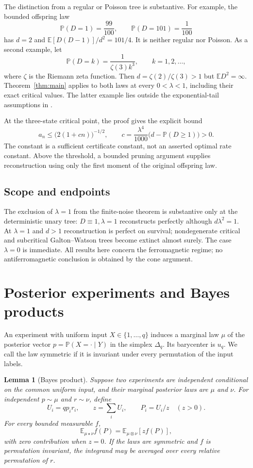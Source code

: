 \documentclass[11pt,reqno]{amsart}
\newtheorem{lemma}[theorem]{Lemma}
\theoremstyle{definition}
\theoremstyle{remark}
\newcommand{\E}{\mathbb E}
\newcommand{\Prob}{\mathbb P}
\begin{document}
The distinction from a regular or Poisson tree is substantive. For example, the bounded offspring law
\[
 \Prob(D=1)=\frac{99}{100},\qquad \Prob(D=101)=\frac1{100}
\]
has $d=2$ and $\E[D(D-1)]/d^2=101/4$. It is neither regular nor Poisson. As a second example, let
\[
 \Prob(D=k)=\frac1{\zeta(3)k^3},\qquad k=1,2,\ldots,
\]
where $\zeta$ is the Riemann zeta function. Then $d=\zeta(2)/\zeta(3)>1$ but $\E D^2=\infty$. Theorem~\ref{thm:main} applies to both laws at every $0<\lambda<1$, including their exact critical values. The latter example lies outside the exponential-tail assumptions in \cite{MSS2025}.

At the three-state critical point, the proof gives the explicit bound
\[
 a_n\le\bigl(2(1+cn)\bigr)^{-1/2},\qquad
 c=\frac{\lambda^4}{1000}\bigl(d-\Prob(D\ge1)\bigr)>0.
\]
The constant is a sufficient certificate constant, not an asserted optimal rate constant. Above the threshold, a bounded pruning argument supplies reconstruction using only the first moment of the original offspring law.

\subsection{Scope and endpoints}

The exclusion of $\lambda=1$ from the finite-noise theorem is substantive only at the deterministic unary tree: $D\equiv1,\lambda=1$ reconstructs perfectly although $d\lambda^2=1$. At $\lambda=1$ and $d>1$ reconstruction is perfect on survival; nondegenerate critical and subcritical Galton--Watson trees become extinct almost surely. The case $\lambda=0$ is immediate. All results here concern the ferromagnetic regime; no antiferromagnetic conclusion is obtained by the cone argument.

\section{Posterior experiments and Bayes products}\label{sec:experiments}

An experiment with uniform input $X\in\{1,\ldots,q\}$ induces a marginal law $\mu$ of the posterior vector $p=\Prob(X=\cdot\mid Y)$ in the simplex $\Delta_q$. Its barycenter is $u_q$. We call the law symmetric if it is invariant under every permutation of the input labels.

\begin{lemma}[Bayes product]\label{lem:bayes}
Suppose two experiments are independent conditional on the common uniform input, and their marginal posterior laws are $\mu$ and $\nu$. For independent $p\sim\mu$ and $r\sim\nu$, define
\[
 U_i=q p_i r_i,\qquad z=\sum_iU_i,\qquad P_i=U_i/z\quad(z>0).
\]
For every bounded measurable $f$,
\begin{equation}\label{eq:bayes-product}
 \E_{\mu\star\nu}f(P)=\E_{\mu\otimes\nu}[z f(P)],
\end{equation}
with zero contribution when $z=0$. If the laws are symmetric and $f$ is permutation invariant, the integrand may be averaged over every relative permutation of $r$.
\end{lemma}
\end{document}
